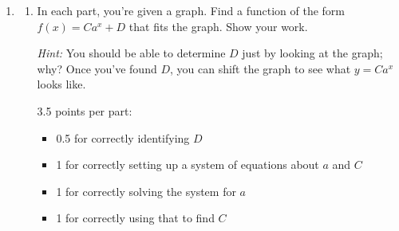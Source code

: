 \documentclass{article}
\makeatletter
\let\@href=\href
\renewcommand{\href}[2]{\@href{#1}{\ul{#2}}}
\makeatother
\begin{document}
\begin{enumerate}
\begin{enumerate}
    \begin{problem}[\vfill\newpage]
      \href{https://ourworldindata.org/explorers/coronavirus-data-explorer?zoomToSelection=true&time=2020-03-01..2020-05-01&facet=none&country=~OWID_WRL&pickerSort=asc&pickerMetric=location&Interval=7-day+rolling+average&Relative+to+Population=false&Color+by+test+positivity=false&Metric=Confirmed+cases}{This graph} shows the data for COVID cases between March 1, 2020 to May 1, 2020.

      Does it seem reasonable to model this using an exponential function? What real world factors make this situation different from the situation between March 1, 2020 and March 25, 2020? 
    \end{problem}

    \begin{solution}
      It does not seem reasonable to model the COVID cases in this period using an exponential
      function, because the rate of change of the number of new cases decreases drastically
      in April. This may have been due to social distancing and lockdown policies.
    \end{solution}

  \end{enumerate}

\item %

  \begin{enumerate}
  \item In each part, you're given a graph. Find a function of the form $f(x) = C a^x + D$ that fits the graph. Show your work. 

    {\it Hint:} You should be able to determine $D$ just by looking at the graph; why? Once you've found $D$, you can shift the graph to see what $y = Ca^x$ looks like.

    \begin{grading} 
      3.5 points per part:
      \begin{itemize}[nosep]
      \item 0.5 for correctly identifying $D$
      \item 1 for correctly setting up a system of equations about $a$ and $C$
      \item 1 for correctly solving the system for $a$
      \item 1 for correctly using that to find $C$
      \end{itemize}
    \end{grading}


\end{enumerate}
\end{enumerate}
\end{document}
